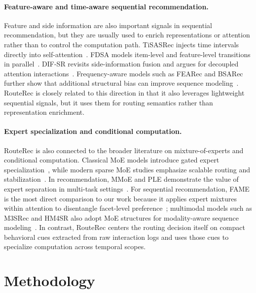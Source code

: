 \documentclass[sigconf,anonymous,review]{acmart}
\begin{document}
\paragraph{Feature-aware and time-aware sequential recommendation.}
Feature and side information are also important signals in sequential recommendation, but they are usually used to enrich representations or attention rather than to control the computation path. TiSASRec injects time intervals directly into self-attention~\cite{li2020tisasrec}. FDSA models item-level and feature-level transitions in parallel~\cite{zhang2019fdsa}. DIF-SR revisits side-information fusion and argues for decoupled attention interactions~\cite{xie2022difsr}. Frequency-aware models such as FEARec and BSARec further show that additional structural bias can improve sequence modeling~\cite{du2023fearec,shin2024bsarec}. RouteRec is closely related to this direction in that it also leverages lightweight sequential signals, but it uses them for routing semantics rather than representation enrichment.

\paragraph{Expert specialization and conditional computation.}
RouteRec is also connected to the broader literature on mixture-of-experts and conditional computation. Classical MoE models introduce gated expert specialization~\cite{jacobs1991adaptive,jordan1994hme}, while modern sparse MoE studies emphasize scalable routing and stabilization~\cite{shazeer2017moe,lepikhin2021gshard,fedus2022switch,zhou2022expertchoice,wang2024lossfree}. In recommendation, MMoE and PLE demonstrate the value of expert separation in multi-task settings~\cite{ma2018mmoe,tang2020ple}. For sequential recommendation, FAME is the most direct comparison to our work because it applies expert mixtures within attention to disentangle facet-level preference~\cite{liu2025fame}; multimodal models such as M3SRec and HM4SR also adopt MoE structures for modality-aware sequence modeling~\cite{bian2023m3srec,zhang2025hm4sr}. In contrast, RouteRec centers the routing decision itself on compact behavioral cues extracted from raw interaction logs and uses those cues to specialize computation across temporal scopes.

\section{Methodology}
\label{sec:method}
\end{document}
